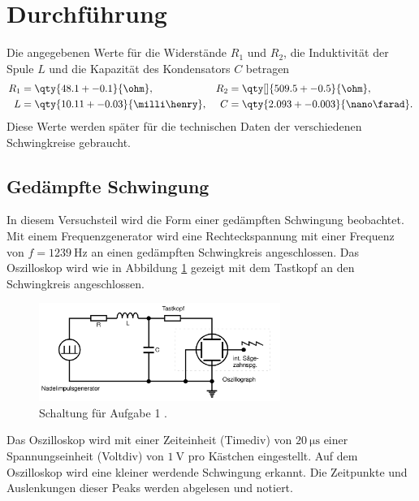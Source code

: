 \section{Durchführung}

Die angegebenen Werte für die Widerstände $R_1$ und $R_2$, die Induktivität der Spule $L$ und die Kapazität des Kondensators $C$ betragen
\begin{align*}
    R_1 &= \qty{48.1 +- 0.1 }{\ohm}, & R_2 &= \qty[]{509.5 +- 0.5}{\ohm}, \\
    L &= \qty{10.11 +- 0.03}{\milli \henry},  & C &= \qty{2.093 +- 0.003}{\nano \farad}.
\end{align*}
%
Diese Werte werden später für die technischen Daten der verschiedenen Schwingkreise gebraucht.

\subsection{Gedämpfte Schwingung}
In diesem Versuchsteil wird die Form einer gedämpften Schwingung beobachtet.
Mit einem Frequenzgenerator wird eine Rechteckspannung mit einer Frequenz von 
$f = \qty{1239}{\hertz}$ an einen gedämpften Schwingkreis angeschlossen.
Das Oszilloskop wird wie in Abbildung \ref{fig:Schaltung_a} gezeigt mit dem 
Tastkopf an den Schwingkreis angeschlossen.
\begin{figure}
    \centering
    \includegraphics[width=0.7\textwidth]{Abbildungen/Schaltung_a.png}
    \caption{Schaltung für Aufgabe 1 \cite{man:v354}.}
    \label{fig:Schaltung_a}
\end{figure}
Das Oszilloskop wird mit einer Zeiteinheit (Timediv) von $\qty{20}{\micro\s}$
einer Spannungseinheit (Voltdiv) von $\qty{1}{\volt}$ pro Kästchen eingestellt.
Auf dem Oszilloskop wird eine kleiner werdende Schwingung erkannt.
Die Zeitpunkte und Auslenkungen dieser Peaks werden abgelesen und notiert.


